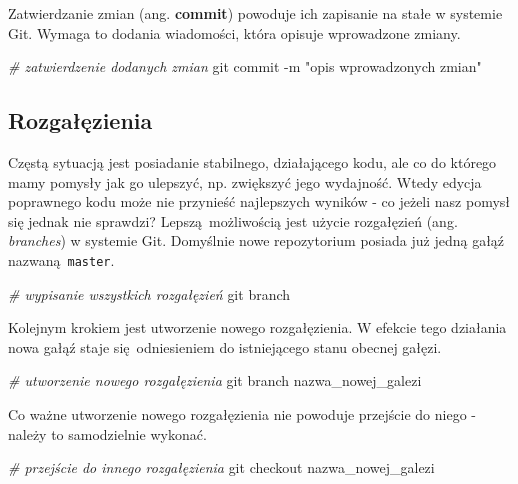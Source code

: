 \documentclass[paper=6in:9in,pagesize=pdftex,headinclude=on,footinclude=on,10pt]{scrbook}
\newenvironment{Shaded}{\begin{snugshade}}{\end{snugshade}}
\newcommand{\CommentTok}[1]{\textcolor[rgb]{0.56,0.35,0.01}{\textit{#1}}}
\newcommand{\FunctionTok}[1]{\textcolor[rgb]{0.00,0.00,0.00}{#1}}
\newcommand{\NormalTok}[1]{#1}
\newcommand{\StringTok}[1]{\textcolor[rgb]{0.31,0.60,0.02}{#1}}
\begin{document}
Zatwierdzanie zmian (ang. \textbf{commit}) powoduje ich zapisanie na stałe w systemie Git.
Wymaga to dodania wiadomości, która opisuje wprowadzone zmiany.

\begin{Shaded}
\begin{Highlighting}[]
\CommentTok{# zatwierdzenie dodanych zmian}
\FunctionTok{git}\NormalTok{ commit -m }\StringTok{"opis wprowadzonych zmian"}
\end{Highlighting}
\end{Shaded}

\hypertarget{branches}{%
\subsection{Rozgałęzienia}\label{branches}}

Częstą sytuacją jest posiadanie stabilnego, działającego kodu, ale co do którego mamy pomysły jak go ulepszyć, np. zwiększyć jego wydajność.
Wtedy edycja poprawnego kodu może nie przynieść najlepszych wyników - co jeżeli nasz pomysł się jednak nie sprawdzi?
Lepszą~możliwością jest użycie rozgałęzień (ang. \emph{branches}) w systemie Git.
Domyślnie nowe repozytorium posiada już jedną gałąź nazwaną~\texttt{master}.

\begin{Shaded}
\begin{Highlighting}[]
\CommentTok{# wypisanie wszystkich rozgałęzień}
\FunctionTok{git}\NormalTok{ branch}
\end{Highlighting}
\end{Shaded}

Kolejnym krokiem jest utworzenie nowego rozgałęzienia.
W efekcie tego działania nowa gałąź staje się~odniesieniem do istniejącego stanu obecnej gałęzi.

\begin{Shaded}
\begin{Highlighting}[]
\CommentTok{# utworzenie nowego rozgałęzienia}
\FunctionTok{git}\NormalTok{ branch nazwa_nowej_galezi}
\end{Highlighting}
\end{Shaded}

Co ważne utworzenie nowego rozgałęzienia nie powoduje przejście do niego - należy to samodzielnie wykonać.

\begin{Shaded}
\begin{Highlighting}[]
\CommentTok{# przejście do innego rozgałęzienia}
\FunctionTok{git}\NormalTok{ checkout nazwa_nowej_galezi}
\end{Highlighting}
\end{Shaded}
\end{document}
